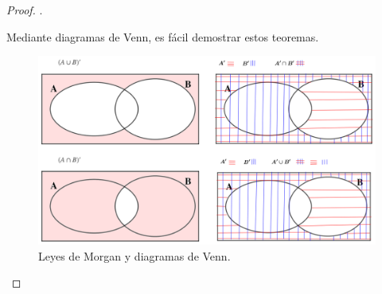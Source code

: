 \begin{proof}.

	Mediante diagramas de Venn, es fácil demostrar estos teoremas.	
	
	\begin{figure}[H]
	\centering
	\includegraphics[width=.85\textwidth]{imagenes/apendices/app08.png}
	\caption*{Leyes de Morgan y diagramas de Venn.}
	\end{figure}
	
\end{proof}


